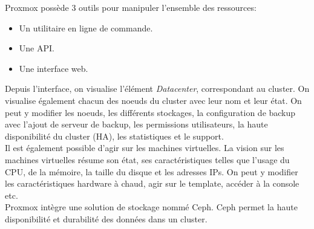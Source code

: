\documentclass[12pt, a4paper, twoside]{article}
\begin{document}
\begin{minipage}{.53\textwidth}%
\gls{Proxmox} possède 3 outils pour manipuler l'ensemble des ressources:
 \begin{itemize}
     \item Un utilitaire en ligne de commande.
     \item Une \gls{API}.
     \item Une interface web.
 \end{itemize}

Depuis l'interface, on visualise l'élément \textit{Datacenter}, correspondant au \gls{cluster}. 
On visualise également chacun des noeuds du \gls{cluster} avec leur nom et leur état. 
On peut y modifier les noeuds, les différents stockages, la configuration de backup avec l'ajout de serveur de backup, les permissions utilisateurs, la haute disponibilité du \gls{cluster} (HA), les statistiques et le support. \\

Il est également possible d'agir sur les machines virtuelles. 
La vision sur les machines virtuelles résume son état, ses caractéristiques telles que l'usage du CPU, de la mémoire, la taille du disque et les adresses IPs. 
On peut y modifier les caractéristiques hardware à chaud, agir sur le template, accéder à la console etc. \\

Proxmox intègre une solution de stockage nommé \gls{Ceph}.
\gls{Ceph} permet la haute disponibilité et durabilité des données dans un \gls{cluster}.

\end{minipage}%

\newpage
\end{document}
